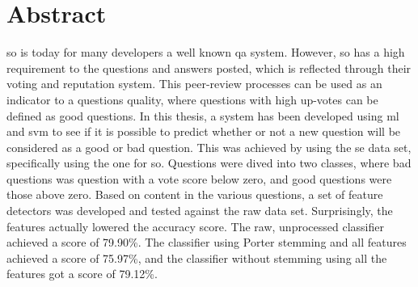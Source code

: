 \chapter*{Abstract}
\gls{so} is today for many developers a well known \gls{qa} system. 
However, \gls{so} has a high requirement to the questions and answers posted, which is reflected through their voting and reputation system. 
This peer-review processes can be used as an indicator to a questions quality, where questions with high up-votes can be defined as good questions.
In this thesis, a system has been developed using  \gls{ml} and \gls{svm} to see if it is possible to predict whether or not a new question will be 
considered as a good or bad question. 
\vspace{0.5em}\newline
This was achieved by using the \gls{se} data set, specifically using the one for \gls{so}. 
Questions were dived into two classes, where bad questions was question with a vote score below zero, and good questions were those above zero. 
Based on content in the various questions, a set of feature detectors was developed and tested against the raw data set. 
Surprisingly, the features actually lowered the accuracy score.
The raw, unprocessed classifier achieved a score of 79.90\%.
The classifier using Porter stemming and all features achieved a score of 75.97\%, and the classifier without stemming using all the features got a score of 79.12\%.


